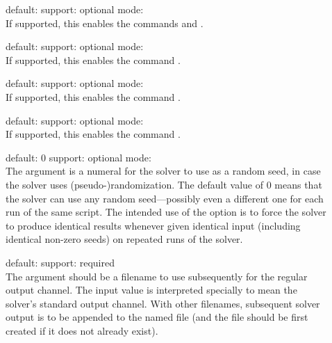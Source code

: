 \begin{description}
\item[] 
\quad default: 
\quad support: optional
\quad mode: 
\\
If supported, this enables the commands  and .  

\item[] 
\quad default: 
\quad support: optional
\quad mode: 
\\
If supported, this enables the command .  

\item[] 
\quad default: 
\quad support: optional
\quad mode: 
\\
If supported, this enables the command .  

\item[] 
\quad default: 
\quad support: optional
\quad mode: 
\\
If supported, this enables the command .  

\item[] 
\quad default: $0$
\quad support: optional
\quad mode: 
\\
The argument is a numeral for the solver to use as a random seed,
in case the solver uses (pseudo-)randomization.
The default value of $0$ means that the solver can use any random seed---possibly 
even a different one for each run of the same script.
The intended use of the option is to force the solver to produce identical results 
whenever given identical input (including identical non-zero seeds) on repeated runs of the solver.

\item[] 
\quad default: 
\quad support: required
\\
The argument should be a filename to use subsequently for
the regular output channel.  The input value  is interpreted
specially to mean the solver's standard output channel.
With other filenames, subsequent solver output is to be appended to the named file 
(and the file should be first created if it does not  already exist).


\end{description}
